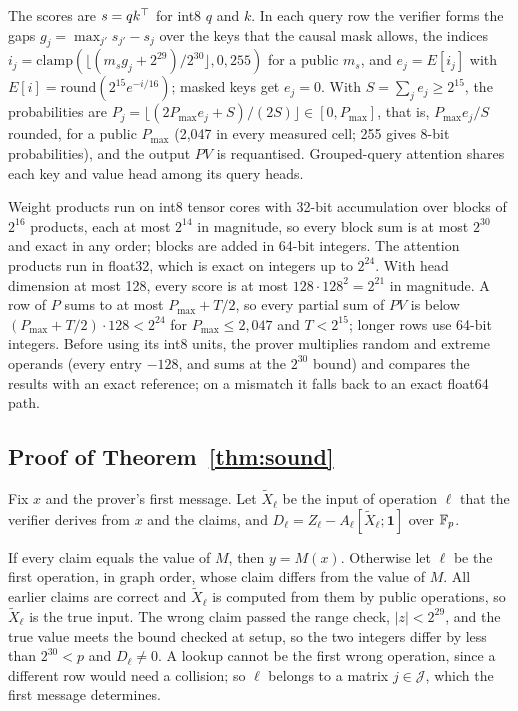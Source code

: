  The scores are $s=qk^\top$ for int8 $q$ and $k$. In each query row the verifier forms
the gaps $g_j=\max_{j'}s_{j'}-s_j$ over the keys that the causal mask allows, the indices
$i_j=\mathrm{clamp}(\lfloor(m_sg_j+2^{29})/2^{30}\rfloor,0,255)$ for a public $m_s$, and
$e_j=E[i_j]$ with $E[i]=\mathrm{round}(2^{15}e^{-i/16})$; masked keys get $e_j=0$. With
$S=\sum_je_j\ge2^{15}$, the probabilities are $P_j=\lfloor(2P_{\max}e_j+S)/(2S)\rfloor\in[0,P_{\max}]$,
that is, $P_{\max}e_j/S$ rounded, for a public $P_{\max}$ (2{,}047 in every measured cell; 255 gives
8-bit probabilities), and the output $PV$ is requantised. Grouped-query attention shares each key and
value head among its query heads.

 Weight products run on int8 tensor cores with 32-bit accumulation
over blocks of $2^{16}$ products, each at most $2^{14}$ in magnitude, so every block sum is at most
$2^{30}$ and exact in any order; blocks are added in 64-bit integers. The attention products run in
float32, which is exact on integers up to $2^{24}$. With head dimension at most 128, every score is
at most $128\cdot128^2=2^{21}$ in magnitude. A row of $P$ sums to at most $P_{\max}+T/2$, so every
partial sum of $PV$ is below $(P_{\max}+T/2)\cdot128<2^{24}$ for $P_{\max}\le2{,}047$ and $T<2^{15}$; longer rows use 64-bit integers.
Before using its int8 units, the prover multiplies random and extreme operands (every entry $-128$,
and sums at the $2^{30}$ bound) and compares the results with an exact reference; on a mismatch it
falls back to an exact float64 path.

\subsection{Proof of Theorem~\ref{thm:sound}}
\label{app:sound}

Fix $x$ and the prover's first message. Let $\tilde X_\ell$ be the input of operation $\ell$ that the
verifier derives from $x$ and the claims, and $D_\ell=Z_\ell-A_\ell[\tilde X_\ell;\mathbf 1]$ over
$\mathbb{F}_p$.

 If every claim equals the value of $M$, then $y=M(x)$. Otherwise
let $\ell$ be the first operation, in graph order, whose claim differs from the value of $M$. All
earlier claims are correct and $\tilde X_\ell$ is computed from them by public operations, so
$\tilde X_\ell$ is the true input. The wrong claim passed the range check, $|z|<2^{29}$, and the true
value meets the bound checked at setup, so the two integers differ by less than $2^{30}<p$ and
$D_\ell\neq0$. A lookup cannot be the first wrong operation, since a different row would need a
collision; so $\ell$ belongs to a matrix $j\in\mathcal J$, which the first message determines.

